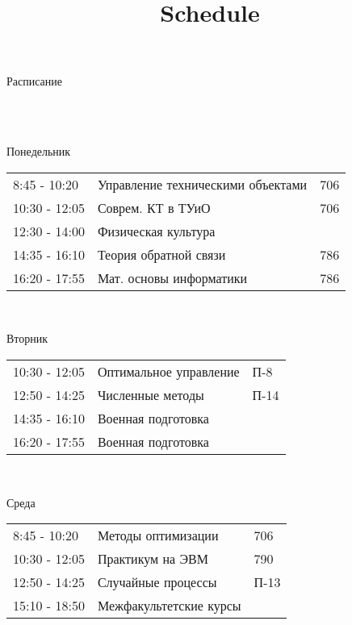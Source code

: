 \documentclass[12pt,a4paper]{article}
\title{Schedule}
\begin{document}
\begin{Huge} Расписание  \end{Huge}   \\ \\
    {\begin{Large} Понедельник  \end{Large}  
        \begin{table}[!h]
        \begin{tabular}{ p{3cm}  p{10cm} p{5cm} }  
            8:45 - 10:20 & Управление техническими объектами & 706\\
            10:30 - 12:05 & Соврем. КТ в ТУиО & 706\\
            12:30 - 14:00 & Физическая культура & \\
            14:35 - 16:10 & Теория обратной связи & 786\\
            16:20 - 17:55 & Мат. основы информатики & 786\\
        \end{tabular}
        \end{table} \\
    {\begin{Large} Вторник  \end{Large}  
        \begin{table}[!h]
        \begin{tabular}{ p{3cm}  p{10cm} p{5cm} }  
            10:30 - 12:05 & Оптимальное управление & П-8\\
            12:50 - 14:25 & Численные методы & П-14\\
            14:35 - 16:10 & Военная подготовка & \\
            16:20 - 17:55 & Военная подготовка & \\
        \end{tabular}
        \end{table} \\
    {\begin{Large} Среда  \end{Large}  
        \begin{table}[!h]
        \begin{tabular}{ p{3cm}  p{10cm} p{5cm} }  
            8:45 - 10:20 & Методы оптимизации & 706\\
            10:30 - 12:05 & Практикум на ЭВМ & 790\\
            12:50 - 14:25 & Случайные процессы & П-13\\
            15:10 - 18:50 & Межфакультетские курсы & \\

\end{tabular}
\end{table}}}}
\end{document}
